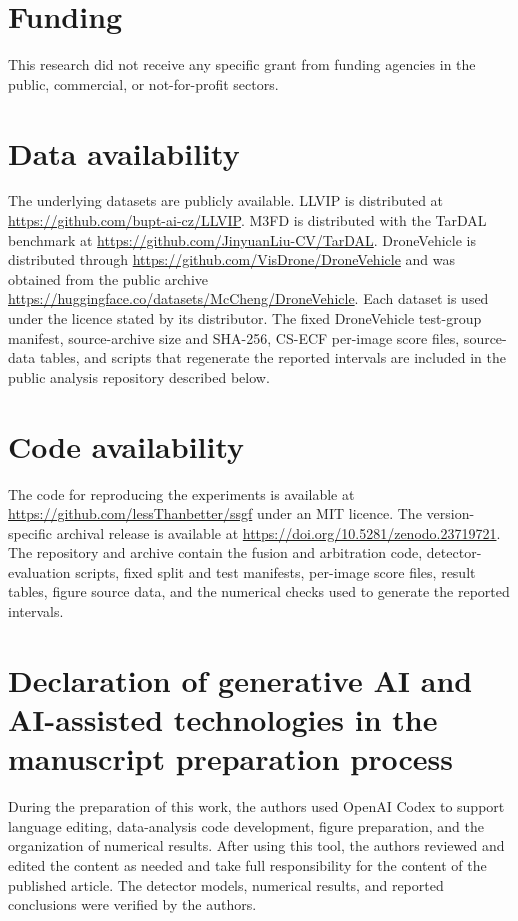\documentclass[preprint,11pt]{elsarticle}
\begin{document}
\section*{Funding}

This research did not receive any specific grant from funding agencies in the
public, commercial, or not-for-profit sectors.

\section*{Data availability}

The underlying datasets are publicly available. LLVIP is distributed at
\url{https://github.com/bupt-ai-cz/LLVIP}. M3FD is distributed with the TarDAL
benchmark at \url{https://github.com/JinyuanLiu-CV/TarDAL}. DroneVehicle is
distributed through \url{https://github.com/VisDrone/DroneVehicle} and was
obtained from the public archive
\url{https://huggingface.co/datasets/McCheng/DroneVehicle}. Each dataset is used
under the licence stated by its distributor. The fixed DroneVehicle test-group
manifest, source-archive size and SHA-256, CS-ECF per-image score files,
source-data tables, and scripts that regenerate the reported intervals are
included in the public analysis repository described below.

\section*{Code availability}

The code for reproducing the experiments is available at
\url{https://github.com/lessThanbetter/ssgf} under an MIT licence. The
version-specific archival release is available at
\url{https://doi.org/10.5281/zenodo.23719721}. The repository and archive contain
the fusion and arbitration code, detector-evaluation scripts, fixed split and
test manifests, per-image score files, result tables, figure source data, and
the numerical checks used to generate the reported intervals.

\section*{Declaration of generative AI and AI-assisted technologies in the
manuscript preparation process}

During the preparation of this work, the authors used OpenAI Codex to support
language editing, data-analysis code development, figure preparation, and the
organization of numerical results. After using this tool, the authors reviewed
and edited the content as needed and take full responsibility for the content
of the published article. The detector models, numerical results, and reported
conclusions were verified by the authors.



\end{document}
